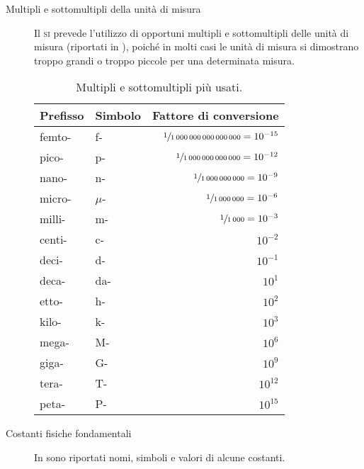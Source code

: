 \documentclass[a4paper,11pt,italian]{article}
\begin{document}
\begin{description}
  \item[Multipli e sottomultipli della unità di misura] 
  Il \textsc{si} prevede l'utilizzo di opportuni multipli e sottomultipli delle unità di misura (riportati in ), poiché in molti casi le unità di misura si dimostrano troppo grandi o troppo piccole per una determinata misura.
  \begin{table}[htp]\centering
    \begin{tabular}{llr}\toprule
      \textbf{Prefisso} & \textbf{Simbolo} & \textbf{Fattore di conversione} \\\midrule
      femto- & f- & $ \sfrac{1}{1\,000\,000\,000\,000\,000} = 10^{-15} $\\\addlinespace[.2em]
      pico- & p- & $ \sfrac{1}{1\,000\,000\,000\,000} = 10^{-12} $\\\addlinespace[.2em]
      nano- & n- & $ \sfrac{1}{1\,000\,000\,000} = 10^{-9} $\\\addlinespace[.2em]
      micro- & $ \mu $- & $ \sfrac{1}{1\,000\,000} = 10^{-6} $\\\addlinespace[.2em]
      milli- & m- & $ \sfrac{1}{1\,000} = 10^{-3} $\\\addlinespace[.2em]
      centi- & c- & $ 10^{-2} $\\\addlinespace[.2em]
      deci- & d- & $ 10^{-1} $\\\addlinespace[.2em]
      deca- & da- & $ 10^{1} $\\\addlinespace[.2em]
      etto- & h- & $ 10^{2} $\\\addlinespace[.2em]
      kilo- & k- & $ 10^{3} $\\\addlinespace[.2em]
      mega- & M- & $ 10^{6} $\\\addlinespace[.2em]
      giga- & G- & $ 10^{9} $\\\addlinespace[.2em]
      tera- & T- & $ 10^{12} $\\\addlinespace[.2em]
      peta- & P- & $ 10^{15} $\\\bottomrule
    \end{tabular}
  \caption{Multipli e sottomultipli più usati.}
    \label{tab:multipliesottomultipli}
  \end{table}
  
  \item[Costanti fisiche fondamentali] In  sono riportati nomi, simboli e valori di alcune costanti.
  

\end{description}
\end{document}
